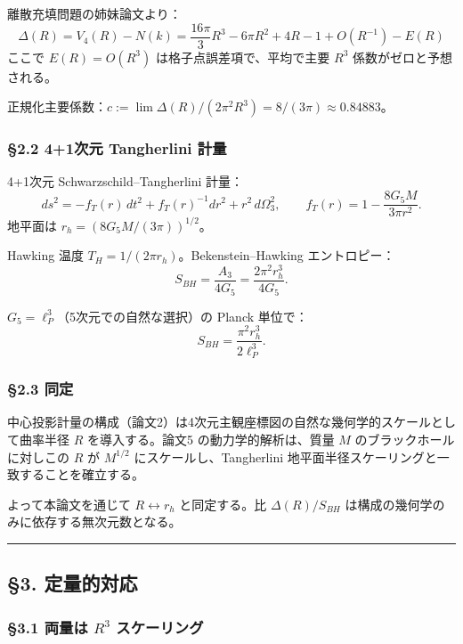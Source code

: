 \documentclass[a4paper,11pt]{ltjsarticle}
\theoremstyle{definition}
\begin{document}
離散充填問題の姉妹論文より：
\[\Delta(R) = V_4(R) - N(k) = \frac{16\pi}{3} R^3 - 6\pi R^2 + 4R - 1 + O(R^{-1}) - E(R)\]
ここで \(E(R) = O(R^3)\) は格子点誤差項で、平均で主要 \(R^3\)
係数がゼロと予想される。

正規化主要係数：\(c := \lim \Delta(R)/(2\pi^2 R^3) = 8/(3\pi) \approx 0.84883\)。

\subsubsection{§2.2 4+1次元 Tangherlini
計量}\label{ux6b21ux5143-tangherlini-ux8a08ux91cf}

4+1次元 Schwarzschild--Tangherlini 計量：
\[ds^2 = -f_T(r)\, dt^2 + f_T(r)^{-1} dr^2 + r^2\, d\Omega_3^2, \qquad f_T(r) = 1 - \frac{8 G_5 M}{3\pi r^2}.\]
地平面は \(r_h = (8 G_5 M/(3\pi))^{1/2}\)。

Hawking 温度 \(T_H = 1/(2\pi r_h)\)。Bekenstein--Hawking エントロピー：
\[S_{BH} = \frac{A_3}{4 G_5} = \frac{2\pi^2 r_h^3}{4 G_5}.\]

\(G_5 = \ell_P^3\)（5次元での自然な選択）の Planck 単位で：
\[S_{BH} = \frac{\pi^2 r_h^3}{2 \ell_P^3}.\]

\subsubsection{§2.3 同定}\label{ux540cux5b9a}

中心投影計量の構成（論文2）は4次元主観座標図の自然な幾何学的スケールとして曲率半径
\(R\) を導入する。論文5 の動力学的解析は、質量 \(M\)
のブラックホールに対しこの \(R\) が \(M^{1/2}\)
にスケールし、Tangherlini
地平面半径スケーリングと一致することを確立する。

よって本論文を通じて \(R \leftrightarrow r_h\) と同定する。比
\(\Delta(R)/S_{BH}\) は構成の幾何学のみに依存する無次元数となる。

\begin{center}\rule{0.5\linewidth}{0.5pt}\end{center}

\subsection{§3. 定量的対応}\label{ux5b9aux91cfux7684ux5bfeux5fdc}

\subsubsection{\texorpdfstring{§3.1 両量は \(R^3\)
スケーリング}{§3.1 両量は R\^{}3 スケーリング}}\label{ux4e21ux91cfux306f-r3-ux30b9ux30b1ux30fcux30eaux30f3ux30b0}
\end{document}
